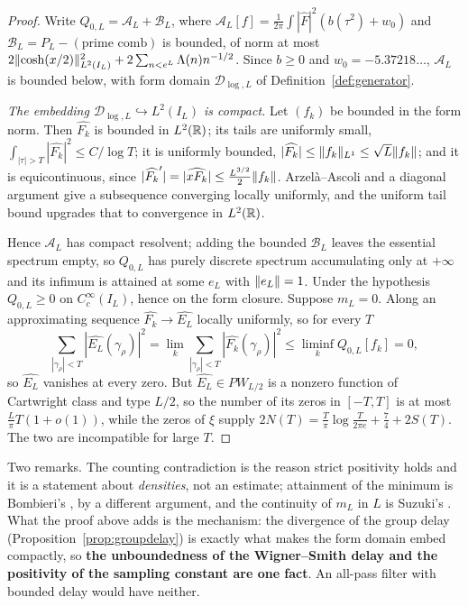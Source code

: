 \begin{proof}
Write $Q_{0,L}=\mathcal A_L+\mathcal B_L$, where
$\mathcal A_L[f]=\frac1{2\pi}\int|\widehat F|^2(b(\tau^2)+w_0)$ and
$\mathcal B_L=P_L-(\text{prime comb})$ is bounded, of norm at most
$2\lVert \cosh(x/2)\rVert^2_{L^2(I_L)}+2\sum_{n<e^L}\Lambda(n)n^{-1/2}$. Since
$b\geq0$ and $w_0=-5.37218\ldots$, $\mathcal A_L$ is bounded below, with form
domain $\mathcal D_{\log,L}$ of Definition~\ref{def:generator}.

\emph{The embedding $\mathcal D_{\log,L}\hookrightarrow L^2(I_L)$ is compact.}
Let $(f_k)$ be bounded in the form norm. Then $\widehat{F_k}$ is bounded in
$L^2(\mathbb R)$; its tails are uniformly small, $\int_{|\tau|>T}|\widehat{F_k}|^2\leq
C/\log T$; it is uniformly bounded, $|\widehat{F_k}|\leq\lVert f_k\rVert_{L^1}\leq
\sqrt L\lVert f_k\rVert$; and it is equicontinuous, since
$|\widehat{F_k}'|=|\widehat{xF_k}|\leq\frac{L^{3/2}}2\lVert f_k\rVert$. Arzel\`a--Ascoli
and a diagonal argument give a subsequence converging locally uniformly, and the
uniform tail bound upgrades that to convergence in $L^2(\mathbb R)$.

Hence $\mathcal A_L$ has compact resolvent; adding the bounded $\mathcal B_L$
leaves the essential spectrum empty, so $Q_{0,L}$ has purely discrete spectrum
accumulating only at $+\infty$ and its infimum is attained at some $e_L$ with
$\lVert e_L\rVert=1$. Under the hypothesis $Q_{0,L}\geq0$ on $C_c^\infty(I_L)$, hence on
the form closure. Suppose $m_L=0$. Along an approximating sequence
$\widehat{F_k}\to\widehat{E_L}$ locally uniformly, so for every $T$
\[
 \sum_{|\gamma_\rho|<T}|\widehat{E_L}(\gamma_\rho)|^2
 =\lim_k\sum_{|\gamma_\rho|<T}|\widehat{F_k}(\gamma_\rho)|^2
 \leq\liminf_kQ_{0,L}[f_k]=0 ,
\]
so $\widehat{E_L}$ vanishes at every zero. But $\widehat{E_L}\in PW_{L/2}$ is a
nonzero function of Cartwright class and type $L/2$, so the number of its zeros in
$[-T,T]$ is at most $\frac L\pi T(1+o(1))$, while the zeros of $\xi$ supply
$2N(T)=\frac T\pi\log\frac T{2\pi e}+\frac74+2S(T)$. The two are incompatible for
large $T$.
\end{proof}

Two remarks. The counting contradiction is the reason strict positivity holds and
it is a statement about \emph{densities}, not an estimate; attainment of the
minimum is Bombieri's \cite{BombieriWeil}, by a different argument, and the
continuity of $m_L$ in $L$ is Suzuki's \cite{Suzuki}. What the proof above adds is
the mechanism: the divergence of the group delay
(Proposition~\ref{prop:groupdelay}) is exactly what makes the form domain embed
compactly, so \textbf{the unboundedness of the Wigner--Smith delay and the
positivity of the sampling constant are one fact}. An all-pass filter with bounded
delay would have neither.

